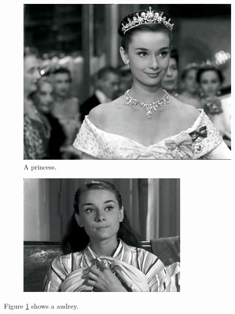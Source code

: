 \documentclass{article}
\begin{document}
\begin{figure}
  \includegraphics[width=\linewidth]{princess.jpg}
  \caption{A princess.}
  \label{fig:audrey}
\end{figure}

\begin{figure}[h!]
  \includegraphics[width=\linewidth]{pajama.jpg}
\end{figure}

Figure \ref{fig:audrey} shows a audrey.
\end{document}

